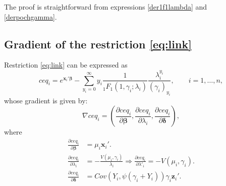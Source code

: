 The proof is straightforward from expressions \eqref{der1f1lambda} and \eqref{derpochgamma}.

\subsection{Gradient of the restriction \eqref{eq:link}}

Restriction \eqref{eq:link} can be expressed as
$$ ceq_i = e^{\mathbf{x}_i'\boldsymbol{\beta}} - \sum_{y_i = 0}^{\infty} y_i \frac{1}{_{1}F_{1}\left(1, \gamma_i; \lambda_i \right)} \frac{\lambda_i^{y_i}} {\left(\gamma_i \right)_{y_i}}, \qquad i=1,\dots,n, $$
whose gradient is given by:
$$ \nabla ceq_i = \left(\frac{\partial ceq_i}{\partial \boldsymbol{\beta}}, \frac{\partial ceq_i}{\partial \lambda_i}, \frac{\partial ceq_i}{\partial \boldsymbol{\delta}} \right), $$
where
\begin{align*}
   \frac{\partial ceq_i}{\partial \boldsymbol{\beta}} & = \mu_i \mathbf{x}_i'. \\
   \frac{\partial ceq_i}{\partial \lambda_i} & = - \frac{V\left(\mu_i,\gamma_i\right)}{\lambda_i} \Longrightarrow \frac{\partial ceq_i}{\partial \lambda'_i} = - V\left(\mu_i,\gamma_i\right).\\
   \frac{\partial ceq_i}{\partial \boldsymbol{\delta}} & = Cov\left(Y_i, \psi\left(\gamma_i + Y_i\right)\right) \gamma_i \mathbf{z}_i'.
\end{align*}

